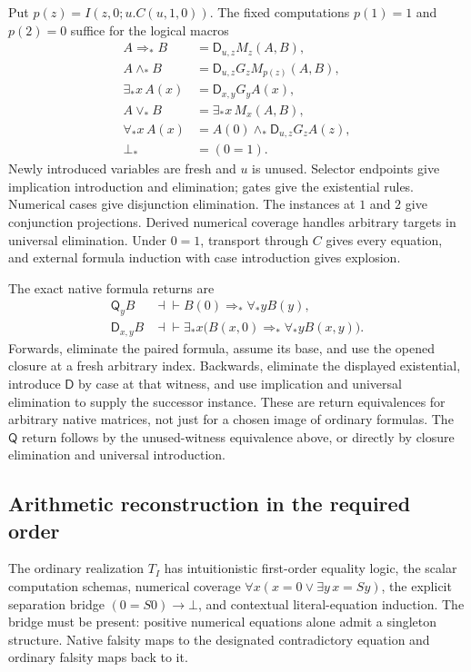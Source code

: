 \documentclass[11pt,letterpaper]{article}
\theoremstyle{definition}\newtheorem{definition}[theorem]{Definition}
\theoremstyle{remark}\newtheorem{remark}[theorem]{Remark}
\newcommand{\D}{\mathsf D}
\newcommand{\Q}{\mathsf Q}
\begin{document}
Put $p(z)=I(z,0;u.C(u,1,0))$. The fixed computations $p(1)=1$ and
$p(2)=0$ suffice for the logical macros
\begin{align*}
 A\Rightarrow_* B&=\D_{u,z}M_z(A,B),\\
 A\land_* B&=\D_{u,z}G_zM_{p(z)}(A,B),\\
 \exists_*x\,A(x)&=\D_{x,y}G_yA(x),\\
 A\lor_* B&=\exists_*x\,M_x(A,B),\\
 \forall_*x\,A(x)&=A(0)\land_*\D_{u,z}G_zA(z),\\
 \bot_*&=(0=1).
\end{align*}
Newly introduced variables are fresh and $u$ is unused. Selector
endpoints give implication introduction and elimination; gates give
the existential rules. Numerical cases give disjunction elimination.
The instances at $1$ and $2$ give conjunction projections. Derived
numerical coverage handles arbitrary targets in universal elimination.
Under $0=1$, transport through $C$ gives every equation, and external
formula induction with case introduction gives explosion.

The exact native formula returns are
\begin{align*}
 \Q_yB&\dashv\vdash B(0)\Rightarrow_*\forall_*yB(y),\\
 \D_{x,y}B&\dashv\vdash
  \exists_*x\bigl(B(x,0)\Rightarrow_*\forall_*yB(x,y)\bigr).
\end{align*}
Forwards, eliminate the paired formula, assume its base, and use the
opened closure at a fresh arbitrary index. Backwards, eliminate the
displayed existential, introduce $\D$ by case at that witness, and use
implication and universal elimination to supply the successor instance.
These are return equivalences for arbitrary native matrices, not just
for a chosen image of ordinary formulas.
The $\Q$ return follows by the unused-witness equivalence above, or
directly by closure elimination and universal introduction.

\subsection{Arithmetic reconstruction in the required order}

The ordinary realization $T_I$ has intuitionistic first-order equality
logic, the scalar computation schemas, numerical coverage
$\forall x(x=0\lor\exists y\,x=Sy)$, the explicit separation bridge
$(0=S0)\to\bot$, and contextual literal-equation induction.
The bridge must be present: positive numerical equations alone admit
a singleton structure. Native falsity maps to the designated contradictory
equation and ordinary falsity maps back to it.
\end{document}
